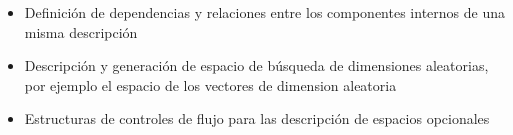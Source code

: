 \begin{itemize}
\begin{itemize}
              \item Definición de dependencias y relaciones entre los componentes internos de una misma descripción
              \item Descripción y generación de espacio de búsqueda de dimensiones aleatorias, por ejemplo el espacio
                    de los vectores de dimension aleatoria
              \item Estructuras de controles de flujo para las descripción de espacios opcionales
          \end{itemize}

\end{itemize}



\newcommand*\rot{\rotatebox{90}}
\newcommand*\OK{\ding{51}}


